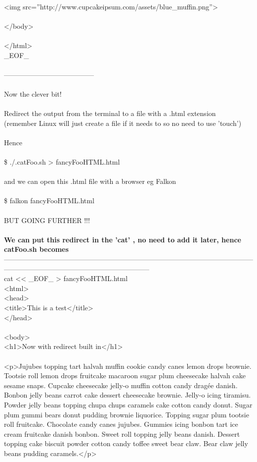 \documentclass[10pt,a4paper]{article}
\begin{document}
{{{{{{{{{{{{{{{{        \\
        <img src=''http://www.cupcakeipsum.com/assets/blue\_muffin.png''}{\Large  >\\
        \\
    </body>\\
\\
</html>\\
\_EOF\_\\
\\
---------------------------------------\\
\\
Now the clever bit!\\
\\
Redirect the output from the terminal to a file with a .html extension\\
(remember Linux will just create a file if it needs to so no need to use 'touch')\\
\\
Hence\\
\\
\$ ./.catFoo.sh > fancyFooHTML.html\\
\\
and we can open this .html file with a browser eg Falkon\\
\\
\$ falkon fancyFooHTML.html\\
\\
BUT GOING FURTHER !!!\\
\\
\textbf{We can put this redirect in the 'cat' , no need to add it later, hence catFoo.sh becomes}}{\Large \\
---------------------------------------------------------------------------------------------------------------------------------------------------------------------------\\
cat << \_EOF\_  > fancyFooHTML.html\\
<html>\\
    <head>\\
        <title>This is a test</title>\\
    </head>\\
\\
    <body>\\
        <h1>Now with redirect built in</h1>\\
        \\
        <p>Jujubes topping tart halvah muffin cookie candy canes lemon drops brownie. Tootsie roll lemon drops fruitcake macaroon sugar plum cheesecake halvah cake sesame snaps. Cupcake cheesecake jelly-o muffin cotton candy dragée danish. Bonbon jelly beans carrot cake dessert cheesecake brownie. Jelly-o icing tiramisu. Powder jelly beans topping chupa chups caramels cake cotton candy donut. Sugar plum gummi bears donut pudding brownie liquorice. Topping sugar plum tootsie roll fruitcake. Chocolate candy canes jujubes. Gummies icing bonbon tart ice cream fruitcake danish bonbon. Sweet roll topping jelly beans danish. Dessert topping cake biscuit powder cotton candy toffee sweet bear claw. Bear claw jelly beans pudding caramels.</p>\\
}}}}}}}}}}}}}}}}
\end{document}
